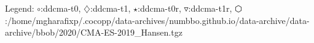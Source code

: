 Legend: {\color{NavyBlue}$\circ$}:ddcma-t0, {\color{Magenta}$\diamondsuit$}:ddcma-t1, {\color{Orange}$\star$}:ddcma-t0r, {\color{CornflowerBlue}$\triangledown$}:ddcma-t1r, {\color{red}$\varhexagon$}:/home/mgharafixp/.cocopp/data-archives/numbbo.github.io/data-archive/data-archive/bbob/2020/CMA-ES-2019\_Hansen.tgz